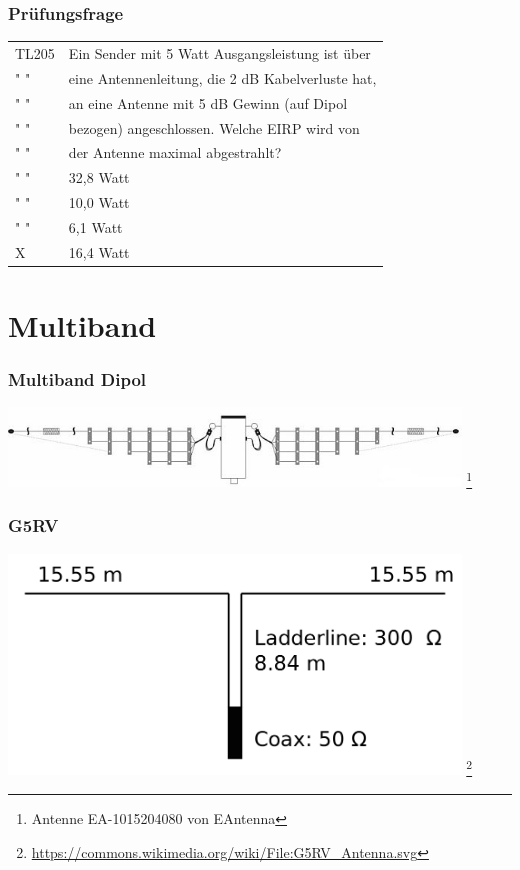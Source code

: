 \begin{frame}
    \frametitle{Prüfungsfrage}

    \begin{center}
    \begin{tabular}{l||l}\hline
        TL205 & Ein Sender mit 5 Watt Ausgangsleistung ist über\\
        " "  & eine Antennenleitung, die 2 dB Kabelverluste hat,\\
        " "  & an eine Antenne mit 5 dB Gewinn (auf Dipol\\
        " "  & bezogen) angeschlossen. Welche EIRP wird von \\
        " "  &  der Antenne maximal abgestrahlt?\\\hline\hline
         " " 	  & 32,8 Watt \\\hline
         " " 	  & 10,0 Watt \\\hline
         " "	  & 6,1 Watt \\\hline
         X 	  & 16,4 Watt\\\hline
    \end{tabular}
 	\end{center}
\end{frame}

\section*{Multiband}

\begin{frame}
    \frametitle{Multiband Dipol}
    \begin{center}
        \includegraphics[width=0.9\textwidth]{e11/Multiband.jpg}
        \footnote{\tiny Antenne EA-1015204080 von EAntenna}
	\end{center}
\end{frame}

\begin{frame}
    \frametitle{G5RV}
    \begin{center}
        \includegraphics[width=0.9\textwidth]{e11/G5RV_Antenna.png}
        \footnote{\tiny \url{https://commons.wikimedia.org/wiki/File:G5RV_Antenna.svg}}
	\end{center}
\end{frame}


